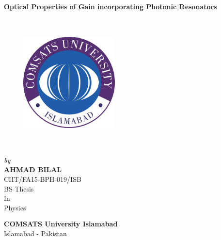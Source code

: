 \documentclass[12pt]{report}
\begin{document}
	\begin{center}
		
		\Large \textbf{Optical Properties of Gain incorporating Photonic Resonators}
		
	\end{center}
\begin{center}
	\begin{figure}[h]
	\centering
	\includegraphics[width=5cm,height=7cm,keepaspectratio]{universitye.jpg}\\
	\end{figure}
\end{center}
	\begin{center}
		\emph{\large by}\\
		
		\Large \textbf{AHMAD BILAL}\\
		\Large CIIT/FA15-BPH-019/ISB\\
		\vfill
		\Large BS Thesis\\
		\Large In\\
		\Large Physics
	\end{center}
	\vfill
	\begin{center}
		\Large \textbf{COMSATS University Islamabad}\\
		\Large Islamabad - Pakistan
	\end{center}
	
\end{document}

